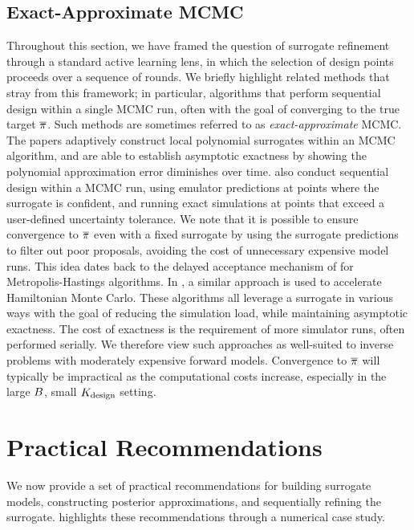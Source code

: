 \documentclass[12pt]{article}
\begin{document}
\subsection{Exact-Approximate MCMC}
Throughout this section, we have framed the question of surrogate refinement through a standard active 
learning lens, in which the selection of design points proceeds over a sequence of rounds. We briefly
highlight related methods that stray from this framework; in particular, algorithms that 
perform sequential design within a single MCMC run, often with the goal of converging 
to the true target $\overline{\pi}$. Such methods are sometimes referred to as \textit{exact-approximate}
MCMC. The papers \citet{Li_2014,ConradLocalExactMCMC} 
adaptively construct local polynomial surrogates within an MCMC algorithm, and are able to establish asymptotic 
exactness by showing the polynomial approximation error diminishes over time.
\citep{ActiveLearningMCMC}
also conduct sequential design within a MCMC run, using emulator predictions at points where the 
surrogate is confident, and running exact simulations at points that exceed a user-defined uncertainty tolerance.
We note that it is possible to ensure convergence to $\overline{\pi}$ even with a fixed surrogate
by using the surrogate predictions to filter out poor proposals, avoiding the cost of unnecessary 
expensive model runs. This idea dates back to the delayed acceptance mechanism of \citep{DelayedAcceptance}
for Metropolis-Hastings algorithms.
In \citet{MCMC_GP_proposal}, a similar approach is used to accelerate Hamiltonian Monte Carlo.
These algorithms all leverage a surrogate in various ways with the goal of reducing the simulation load, while
maintaining asymptotic exactness. The cost of exactness is the requirement of more simulator runs, often 
performed serially. We therefore view such approaches as well-suited to inverse problems with moderately 
expensive forward models. Convergence to $\overline{\pi}$ will typically be impractical as the computational
costs increase, especially in the large $B$, small $K_{\textrm{design}}$ setting.

\section{Practical Recommendations} \label{sec:recs}
We now provide a set of practical recommendations for building surrogate models, constructing
posterior approximations, and sequentially refining the surrogate. 
highlights these recommendations through a numerical case study.
\end{document}
